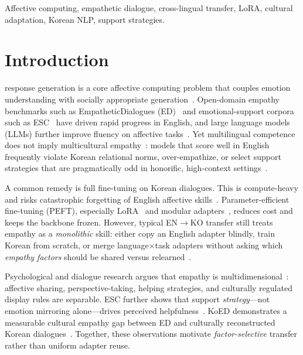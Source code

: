\documentclass[journal]{IEEEtran}
\begin{document}
\begin{IEEEkeywords}
Affective computing, empathetic dialogue, cross-lingual transfer, LoRA, cultural adaptation, Korean NLP, support strategies.
\end{IEEEkeywords}

\section{Introduction}
 response generation is a core affective computing problem that couples emotion understanding with socially appropriate generation~\cite{rashkin2019empathetic,liu2021esc,sharma2020empathy}.
Open-domain empathy benchmarks such as EmpatheticDialogues (ED)~\cite{rashkin2019empathetic} and emotional-support corpora such as ESC~\cite{liu2021esc} have driven rapid progress in English, and large language models (LLMs) further improve fluency on affective tasks~\cite{amin2024chatgpt,sabour2024emobench}.
Yet multilingual competence does not imply multicultural empathy~\cite{lee2025koed,zhou2024culture,ahuja2023mega}: models that score well in English frequently violate Korean relational norms, over-empathize, or select support strategies that are pragmatically odd in honorific, high-context settings~\cite{lee2025koed,matsumoto2008culture}.

A common remedy is full fine-tuning on Korean dialogues.
This is compute-heavy and risks catastrophic forgetting of English affective skills~\cite{kirkpatrick2017overcoming,wang2022lfmlf}.
Parameter-efficient fine-tuning (PEFT), especially LoRA~\cite{hu2022lora} and modular adapters~\cite{houlsby2019adapters,pfeiffer2020madx}, reduces cost and keeps the backbone frozen.
However, typical EN$\rightarrow$KO transfer still treats empathy as a \emph{monolithic} skill: either copy an English adapter blindly, train Korean from scratch, or merge language$\times$task adapters without asking which \emph{empathy factors} should be shared versus relearned~\cite{zhao2025adamerge,borchert2025flare}.

Psychological and dialogue research argues that empathy is multidimensional~\cite{davis1983empathy}: affective sharing, perspective-taking, helping strategies, and culturally regulated display rules are separable.
ESC further shows that support \emph{strategy}---not emotion mirroring alone---drives perceived helpfulness~\cite{liu2021esc,sharma2020empathy}.
KoED demonstrates a measurable cultural empathy gap between ED and culturally reconstructed Korean dialogues~\cite{lee2025koed}.
Together, these observations motivate \emph{factor-selective} transfer rather than uniform adapter reuse.
\end{document}
